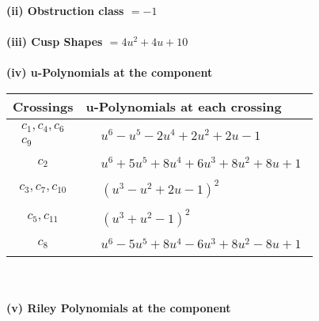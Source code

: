 \documentclass[1p]{elsarticle_modified}
\theoremstyle{definition}
\begin{document}
\flushleft \textbf{(ii) Obstruction class $= -1$}\\~\\
\flushleft \textbf{(iii) Cusp Shapes $= 4 u^2+4 u+10$}\\~\\
\newpage\renewcommand{\arraystretch}{1}
\flushleft \textbf{(iv) u-Polynomials at the component}\newline \\
\begin{tabular}{m{50pt}|m{274pt}}
Crossings & \hspace{64pt}u-Polynomials at each crossing \\
\hline $$\begin{aligned}c_{1},c_{4},c_{6}\\c_{9}\end{aligned}$$&$\begin{aligned}
&u^6- u^5-2 u^4+2 u^2+2 u-1
\end{aligned}$\\
\hline $$\begin{aligned}c_{2}\end{aligned}$$&$\begin{aligned}
&u^6+5 u^5+8 u^4+6 u^3+8 u^2+8 u+1
\end{aligned}$\\
\hline $$\begin{aligned}c_{3},c_{7},c_{10}\end{aligned}$$&$\begin{aligned}
&(u^3- u^2+2 u-1)^2
\end{aligned}$\\
\hline $$\begin{aligned}c_{5},c_{11}\end{aligned}$$&$\begin{aligned}
&(u^3+u^2-1)^2
\end{aligned}$\\
\hline $$\begin{aligned}c_{8}\end{aligned}$$&$\begin{aligned}
&u^6-5 u^5+8 u^4-6 u^3+8 u^2-8 u+1
\end{aligned}$\\
\hline
\end{tabular}\\~\\
\newpage\renewcommand{\arraystretch}{1}
\flushleft \textbf{(v) Riley Polynomials at the component}\newline \\
\end{document}
